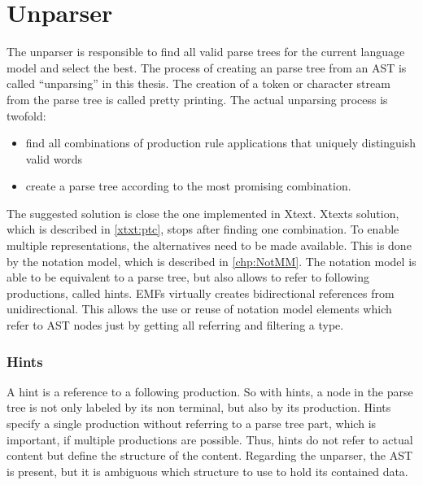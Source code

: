 \chapter{Unparser}
The unparser is responsible to find all valid parse trees for the current language model and select the best. The process of creating an parse tree from an AST is called ``unparsing'' in this thesis. The creation of a token or character stream from the parse tree is called pretty printing. The actual unparsing process is twofold:
\begin{itemize}
	\item find all combinations of production rule applications that uniquely distinguish valid words
	\item create a parse tree according to the most promising combination. 
\end{itemize}
 
The suggested solution is close the one implemented in Xtext. Xtexts solution, which is described in \ref{xtxt:ptc}, stops after finding one combination. 
To enable multiple representations, the alternatives need to be made available. This is done by the notation model, which is described in \ref{chp:NotMM}. The notation model is able to be equivalent to a parse tree, but also allows to refer to following productions, called hints. EMFs  virtually creates bidirectional references from unidirectional. This allows the use or reuse of notation model elements which refer to AST nodes just by getting all referring  and filtering a type.


\subsection {Hints}
A hint is a reference to a following production. So with hints, a node in the parse tree is not only labeled by its non terminal, but also by its production. Hints specify a single production without referring to a parse tree part, which is important, if multiple productions are possible. Thus, hints do not refer to actual content but define the structure of the content. Regarding the unparser, the AST is present, but it is ambiguous which structure to use to hold its contained data.  

